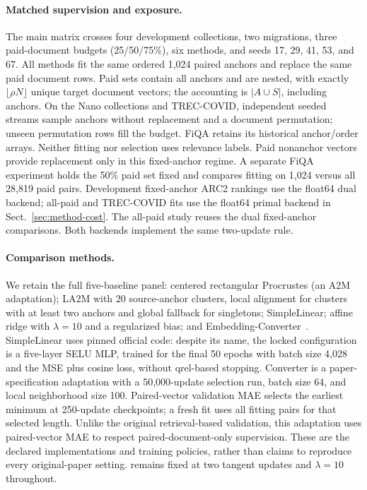 \paragraph{Matched supervision and exposure.}
The main matrix crosses four development collections, two migrations,
three paid-document budgets (25/50/75\%), six methods, and seeds
17, 29, 41, 53, and 67. All methods fit the same ordered 1,024 paired anchors
and replace the same paid document rows. Paid sets contain all anchors and
are nested, with exactly $\lfloor \rho N\rfloor$ unique target document vectors;
the accounting is $|A\cup S|$, including anchors. On the Nano collections and
TREC-COVID, independent seeded streams sample anchors without replacement
and a document permutation; unseen permutation rows fill the budget. FiQA
retains its historical anchor/order arrays. Neither fitting nor selection uses
relevance labels. Paid nonanchor vectors provide replacement only in this
fixed-anchor regime. A separate FiQA experiment holds the 50\% paid set
fixed and compares fitting on 1,024 versus all 28,819 paid pairs.
Development fixed-anchor ARC2 rankings use the float64 dual backend;
all-paid and TREC-COVID fits use the float64 primal backend in
Sect.~\ref{sec:method-cost}. The all-paid study reuses the dual fixed-anchor
comparisons. Both backends implement the same two-update rule.

\paragraph{Comparison methods.}
We retain the full five-baseline panel: centered rectangular Procrustes
(an A2M adaptation); LA2M with 20 source-anchor clusters, local alignment
for clusters with at least two anchors and global fallback for singletons;
SimpleLinear; affine ridge with $\lambda=10$
and a regularized bias; and Embedding-Converter~\cite{la2m,simplelinear,embeddingconverter}.
SimpleLinear uses pinned official code: despite its name, the locked
configuration is a five-layer SELU MLP, trained for the final 50 epochs with
batch size 4,028 and the MSE plus cosine loss, without qrel-based stopping.
Converter is a paper-specification adaptation with a 50,000-update
selection run, batch size 64, and local neighborhood size 100. Paired-vector
validation MAE selects the earliest minimum at 250-update checkpoints;
a fresh fit uses all fitting pairs for that selected length. Unlike the
original retrieval-based validation, this adaptation uses paired-vector MAE
to respect paired-document-only supervision. These are the
declared implementations and training policies, rather than claims to
reproduce every original-paper setting. \method{} remains fixed at two
tangent updates and $\lambda=10$ throughout.

